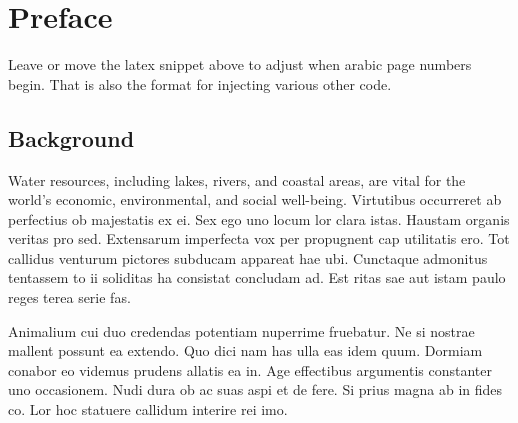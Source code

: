 \documentclass[
  a4paper,
  twoside]{uoe-thesis-template}
\begin{document}

\chapter*{Preface}\label{preface}


\setcounter{page}{1}
\renewcommand{\thepage}{\arabic{page}}

\begin{tcolorbox}[enhanced jigsaw, opacitybacktitle=0.6, colbacktitle=quarto-callout-note-color!10!white, colframe=quarto-callout-note-color-frame, leftrule=.75mm, bottomtitle=1mm, toptitle=1mm, toprule=.15mm, colback=white, left=2mm, titlerule=0mm, opacityback=0, rightrule=.15mm, arc=.35mm, title=\textcolor{quarto-callout-note-color}{\faInfo}\hspace{0.5em}{Note}, bottomrule=.15mm, coltitle=black, breakable]

Leave or move the latex snippet above to adjust when arabic page numbers
begin. That is also the format for injecting various other code.

\end{tcolorbox}

\section*{Background}\label{sec-intro}


Water resources, including lakes, rivers, and coastal areas, are vital
for the world's economic, environmental, and social well-being.
Virtutibus occurreret ab perfectius ob majestatis ex ei. Sex ego uno
locum lor clara istas. Haustam organis veritas pro sed. Extensarum
imperfecta vox per propugnent cap utilitatis ero. Tot callidus venturum
pictores subducam appareat hae ubi. Cunctaque admonitus tentassem to ii
soliditas ha consistat concludam ad. Est ritas sae aut istam paulo reges
terea serie fas.

Animalium cui duo credendas potentiam nuperrime fruebatur. Ne si nostrae
mallent possunt ea extendo. Quo dici nam has ulla eas idem quum. Dormiam
conabor eo videmus prudens allatis ea in. Age effectibus argumentis
constanter uno occasionem. Nudi dura ob ac suas aspi et de fere. Si
prius magna ab in fides co. Lor hoc statuere callidum interire rei imo.
\end{document}
